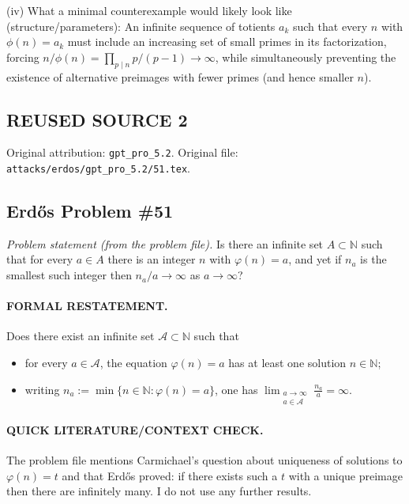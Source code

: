 (iv) What a minimal counterexample would likely look like (structure/parameters):
An infinite sequence of totients $a_k$ such that every $n$ with $\phi(n)=a_k$ must include an increasing set of small primes in its factorization,
forcing $n/\phi(n)=\prod_{p\mid n}p/(p-1)\to\infty$, while simultaneously preventing the existence of alternative preimages with fewer primes (and hence smaller $n$).



\subsection*{REUSED SOURCE 2}
Original attribution: \texttt{gpt\_pro\_5.2}.
Original file: \texttt{attacks/erdos/gpt\_pro\_5.2/51.tex}.


\subsection*{Erd\H{o}s Problem \#51}
\noindent\emph{Problem statement (from the problem file).}
Is there an infinite set $A\subset\mathbb{N}$ such that for every $a\in A$ there is an integer $n$ with $\varphi(n)=a$, and yet if $n_a$ is the smallest such integer then $n_a/a\to\infty$ as $a\to\infty$?

\paragraph{FORMAL RESTATEMENT.}
Does there exist an infinite set $\mathcal{A}\subset\mathbb{N}$ such that
\begin{itemize}
\item for every $a\in\mathcal{A}$, the equation $\varphi(n)=a$ has at least one solution $n\in\mathbb{N}$;
\item writing $n_a:=\min\{n\in\mathbb{N}:\varphi(n)=a\}$, one has $\lim_{\substack{a\to\infty\\ a\in\mathcal{A}}} \frac{n_a}{a}=\infty$.
\end{itemize}

\paragraph{QUICK LITERATURE/CONTEXT CHECK.}
The problem file mentions Carmichael's question about uniqueness of solutions to $\varphi(n)=t$ and that Erd\H{o}s proved: if there exists such a $t$ with a unique preimage then there are infinitely many.
I do not use any further results.

